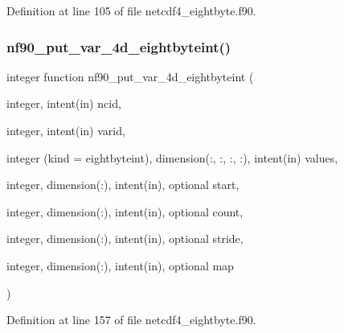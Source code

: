 Definition at line 105 of file netcdf4\+\_\+eightbyte.\+f90.

\mbox{\label{netcdf4__eightbyte_8f90_a2fcc7dafad70cffd89123ddbd491b3d0}} 
\subsubsection{\texorpdfstring{nf90\+\_\+put\+\_\+var\+\_\+4d\+\_\+eightbyteint()}{nf90\_put\_var\_4d\_eightbyteint()}}
{\footnotesize\ttfamily integer function nf90\+\_\+put\+\_\+var\+\_\+4d\+\_\+eightbyteint (\begin{DoxyParamCaption}\item[{integer, intent(in)}]{ncid,  }\item[{integer, intent(in)}]{varid,  }\item[{integer (kind = eightbyteint), dimension(\+:, \+:, \+:, \+:), intent(in)}]{values,  }\item[{integer, dimension(\+:), intent(in), optional}]{start,  }\item[{integer, dimension(\+:), intent(in), optional}]{count,  }\item[{integer, dimension(\+:), intent(in), optional}]{stride,  }\item[{integer, dimension(\+:), intent(in), optional}]{map }\end{DoxyParamCaption})}



Definition at line 157 of file netcdf4\+\_\+eightbyte.\+f90.

\mbox{\label{netcdf4__eightbyte_8f90_a7c70c2c6493acd29cd6e7ac1ce969b00}} 
